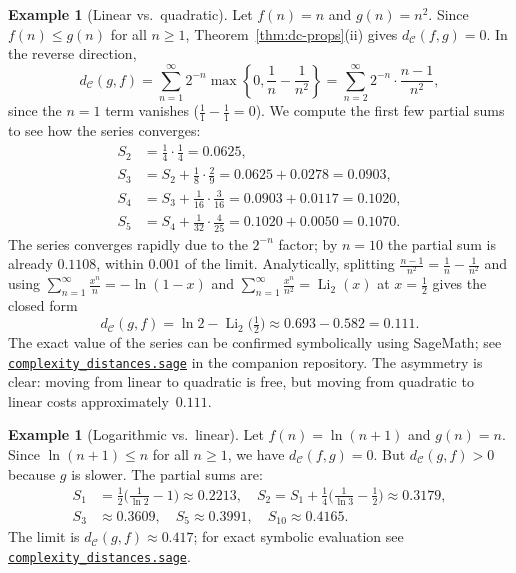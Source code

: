 \documentclass[11pt,a4paper]{article}
\newcommand{\repourl}{https://github.com/gabayae/expansive-homeomorphisms-complexity-qmetric}
\theoremstyle{plain}
\theoremstyle{definition}
\newtheorem{exampleinner}[theoreminner]{Example}
\newenvironment{example}[1][]{\begin{exampleinner}[#1]}{\end{exampleinner}}
\newcommand{\C}{\mathcal{C}}
\begin{document}
\begin{example}[Linear vs.\ quadratic]\label{ex:lin-quad}
Let $f(n)=n$ and $g(n)=n^2$.  Since $f(n)\le g(n)$ for all
$n\ge 1$, Theorem~\ref{thm:dc-props}(ii) gives $d_\C(f,g)=0$.
In the reverse direction,
\[
  d_\C(g,f)
  = \sum_{n=1}^{\infty}2^{-n}\max\!\left\{0,\frac{1}{n}-\frac{1}{n^2}\right\}
  = \sum_{n=2}^{\infty}2^{-n}\cdot\frac{n-1}{n^2},
\]
since the $n=1$ term vanishes ($\frac{1}{1}-\frac{1}{1}=0$).
We compute the first few partial sums to see how the series converges:
\begin{align*}
S_2 &= \tfrac{1}{4}\cdot\tfrac{1}{4} = 0.0625, \\
S_3 &= S_2 + \tfrac{1}{8}\cdot\tfrac{2}{9}
     = 0.0625 + 0.0278 = 0.0903, \\
S_4 &= S_3 + \tfrac{1}{16}\cdot\tfrac{3}{16}
     = 0.0903 + 0.0117 = 0.1020, \\
S_5 &= S_4 + \tfrac{1}{32}\cdot\tfrac{4}{25}
     = 0.1020 + 0.0050 = 0.1070.
\end{align*}
The series converges rapidly due to the $2^{-n}$ factor; by $n=10$
the partial sum is already $0.1108$, within $0.001$ of the limit.
Analytically, splitting $\frac{n-1}{n^2}=\frac{1}{n}-\frac{1}{n^2}$ and
using $\sum_{n=1}^\infty\frac{x^n}{n}=-\!\ln(1-x)$ and
$\sum_{n=1}^\infty\frac{x^n}{n^2}=\operatorname{Li}_2(x)$ at $x=\tfrac12$
gives the closed form
\[
  d_\C(g,f) = \ln 2 - \operatorname{Li}_2\!\bigl(\tfrac12\bigr)
  \approx 0.693 - 0.582 = 0.111.
\]
The exact value of the series can be confirmed symbolically
using SageMath; see
\href{\repourl/blob/main/code/sagemath/complexity_distances.sage}{\texttt{complexity\_distances.sage}}
in the companion repository.
The asymmetry is clear: moving from linear to quadratic is free, but
moving from quadratic to linear costs approximately~$0.111$.
\end{example}

\begin{example}[Logarithmic vs.\ linear]\label{ex:log-lin}
Let $f(n)=\ln(n+1)$ and $g(n)=n$.  Since $\ln(n+1)\le n$ for all
$n\ge 1$, we have $d_\C(f,g)=0$.  But $d_\C(g,f)>0$ because $g$
is slower.  The partial sums are:
\begin{align*}
S_1 &= \tfrac{1}{2}\bigl(\tfrac{1}{\ln 2}-1\bigr) \approx 0.2213, \quad
S_2 = S_1 + \tfrac{1}{4}\bigl(\tfrac{1}{\ln 3}-\tfrac{1}{2}\bigr) \approx 0.3179, \\
S_3 &\approx 0.3609, \quad
S_5 \approx 0.3991, \quad
S_{10} \approx 0.4165.
\end{align*}
The limit is $d_\C(g,f)\approx 0.417$; for exact symbolic evaluation see
\href{\repourl/blob/main/code/sagemath/complexity_distances.sage}{\texttt{complexity\_distances.sage}}.
\end{example}
\end{document}
